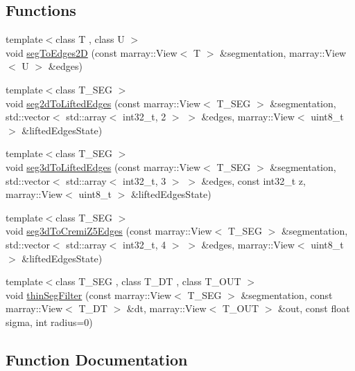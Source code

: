 \subsection*{Functions}
\begin{DoxyCompactItemize}
\item 
{\footnotesize template$<$class T , class U $>$ }\\void \hyperlink{namespacenifty_1_1ground__truth_af49d3596b8aaf59bd7dcf3163e99d08f}{seg\+To\+Edges2\+D} (const marray\+::\+View$<$ T $>$ \&segmentation, marray\+::\+View$<$ U $>$ \&edges)
\item 
{\footnotesize template$<$class T\+\_\+\+S\+E\+G $>$ }\\void \hyperlink{namespacenifty_1_1ground__truth_af4ff3155dceef94452c198adb989d21e}{seg2d\+To\+Lifted\+Edges} (const marray\+::\+View$<$ T\+\_\+\+S\+E\+G $>$ \&segmentation, std\+::vector$<$ std\+::array$<$ int32\+\_\+t, 2 $>$ $>$ \&edges, marray\+::\+View$<$ uint8\+\_\+t $>$ \&lifted\+Edges\+State)
\item 
{\footnotesize template$<$class T\+\_\+\+S\+E\+G $>$ }\\void \hyperlink{namespacenifty_1_1ground__truth_a6d7ab1dca0ac9229967b736100609112}{seg3d\+To\+Lifted\+Edges} (const marray\+::\+View$<$ T\+\_\+\+S\+E\+G $>$ \&segmentation, std\+::vector$<$ std\+::array$<$ int32\+\_\+t, 3 $>$ $>$ \&edges, const int32\+\_\+t z, marray\+::\+View$<$ uint8\+\_\+t $>$ \&lifted\+Edges\+State)
\item 
{\footnotesize template$<$class T\+\_\+\+S\+E\+G $>$ }\\void \hyperlink{namespacenifty_1_1ground__truth_a9db1e8161597359400b066deab0f7dfb}{seg3d\+To\+Cremi\+Z5\+Edges} (const marray\+::\+View$<$ T\+\_\+\+S\+E\+G $>$ \&segmentation, std\+::vector$<$ std\+::array$<$ int32\+\_\+t, 4 $>$ $>$ \&edges, marray\+::\+View$<$ uint8\+\_\+t $>$ \&lifted\+Edges\+State)
\item 
{\footnotesize template$<$class T\+\_\+\+S\+E\+G , class T\+\_\+\+D\+T , class T\+\_\+\+O\+U\+T $>$ }\\void \hyperlink{namespacenifty_1_1ground__truth_a4feb2d90b357085dcc776da2e24a4f64}{thin\+Seg\+Filter} (const marray\+::\+View$<$ T\+\_\+\+S\+E\+G $>$ \&segmentation, const marray\+::\+View$<$ T\+\_\+\+D\+T $>$ \&dt, marray\+::\+View$<$ T\+\_\+\+O\+U\+T $>$ \&out, const float sigma, int radius=0)
\end{DoxyCompactItemize}


\subsection{Function Documentation}
\hypertarget{namespacenifty_1_1ground__truth_af4ff3155dceef94452c198adb989d21e}{}
